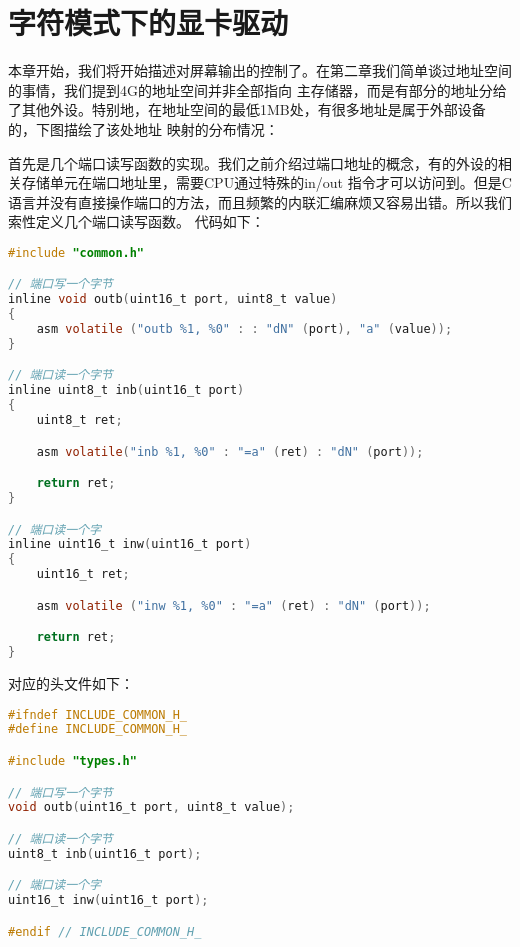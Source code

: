 
\section {字符模式下的显卡驱动}

\par 本章开始，我们将开始描述对屏幕输出的控制了。在第二章我们简单谈过地址空间的事情，我们提到4G的地址空间并非全部指向\allowbreak
主存储器，而是有部分的地址分给了其他外设。特别地，在地址空间的最低1MB处，有很多地址是属于外部设备的，下图描绘了该处地址\allowbreak
映射的分布情况：



\par 首先是几个端口读写函数的实现。我们之前介绍过端口地址的概念，有的外设的相关存储单元在端口地址里，需要CPU通过特殊的in/out\allowbreak
指令才可以访问到。但是C语言并没有直接操作端口的方法，而且频繁的内联汇编麻烦又容易出错。所以我们索性定义几个端口读写函数。\allowbreak
代码如下：

\begin{lstlisting}[language = C, label = libs/common.c, caption = libs/common.c]
#include "common.h"

// 端口写一个字节
inline void outb(uint16_t port, uint8_t value)
{
	asm volatile ("outb %1, %0" : : "dN" (port), "a" (value));
}

// 端口读一个字节
inline uint8_t inb(uint16_t port)
{
	uint8_t ret;

	asm volatile("inb %1, %0" : "=a" (ret) : "dN" (port));

	return ret;
}

// 端口读一个字
inline uint16_t inw(uint16_t port)
{
	uint16_t ret;

	asm volatile ("inw %1, %0" : "=a" (ret) : "dN" (port));

	return ret;
}
\end{lstlisting}

\par 对应的头文件如下：
\begin{lstlisting}[language = C, label = include/common.h, caption = include/common.h]
#ifndef INCLUDE_COMMON_H_
#define INCLUDE_COMMON_H_

#include "types.h"

// 端口写一个字节
void outb(uint16_t port, uint8_t value);

// 端口读一个字节
uint8_t inb(uint16_t port);

// 端口读一个字
uint16_t inw(uint16_t port);

#endif // INCLUDE_COMMON_H_
\end{lstlisting}

